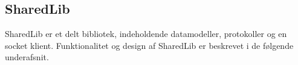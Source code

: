 \subsection{SharedLib}
SharedLib er et delt bibliotek, indeholdende datamodeller, protokoller og en socket klient. Funktionalitet og design af SharedLib er beskrevet i de følgende underafsnit.


